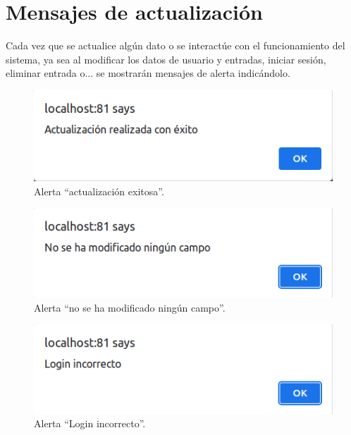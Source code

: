 \documentclass[12pt, twoside]{report}
\begin{document}
\section{Mensajes de actualización}
Cada vez que se actualice algún dato o se interactúe con el funcionamiento del sistema, ya sea al modificar los datos de usuario y entradas, iniciar sesión, eliminar entrada o... se mostrarán mensajes de alerta indicándolo.\\
\begin{figure}[h]
\begin{center}
\includegraphics[scale=0.7]{images/actualización.png}
\end{center}
\caption{\label{inicio} Alerta ``actualización exitosa''.}
\end{figure}
\begin{figure}[h]
\begin{center}
\includegraphics[scale=0.7]{images/actualización2.png}
\end{center}
\caption{\label{inicio} Alerta ``no se ha modificado ningún campo''.}
\end{figure}
\begin{figure}[h]
\begin{center}
\includegraphics[scale=0.7]{images/actualización3.png}
\end{center}
\caption{\label{inicio} Alerta ``Login incorrecto''.}
\end{figure}
\end{document}
